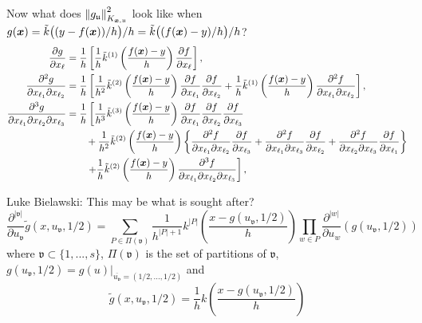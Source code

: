 \documentclass[letterpaper]{amsart}
\newcommand{\KXu}{K_{\vx,\fu}}
\newcommand{\tk}{\tilde{k}}
\begin{document}
Now what does $\norm[\KXu]{g_\fu}^2$ look like when $g(\vx) = \tk\bigl((y-f(\vx))/h\bigr)/h = \tk\bigl((f(\vx) - y)/h\bigr)/h$?
\begin{align*}
	\frac{\partial g}{\partial x_\ell} &= \frac 1{h} \left[ \frac 1h \tk^{(1)}\left(\frac{f(\vx) - y}{h} \right) \frac{\partial f}{\partial x_\ell} \right], \\
	\frac{\partial^2 g}{\partial x_{\ell_1} \partial x_{\ell_2}}
	&= \frac 1{h} \left[\frac 1{h^2} \tk^{(2)}\left(\frac{f(\vx) - y}{h} \right)  \frac{\partial f}{\partial x_{\ell_1}}  \frac{\partial f}{\partial x_{\ell_2}} + \frac 1h \tk^{(1)}\left(\frac{f(\vx) - y}{h} \right)  \frac{\partial^2 f}{\partial x_{\ell_1}\partial x_{\ell_2}} \right], \\
	\frac{\partial^3 g}{\partial x_{\ell_1} \partial x_{\ell_2} \partial x_{\ell_3}}
 &= \frac 1{h} \left[\frac 1{h^3} \tk^{(3)}\left(\frac{f(\vx) - y}{h} \right)  \frac{\partial f}{\partial x_{\ell_1}}  
 \frac{\partial f}{\partial x_{\ell_2}} \frac{\partial f}{\partial x_{\ell_3}} \right.\\
 & \qquad + \frac 1{h^2} \tk^{(2)}\left(\frac{f(\vx) - y}{h} \right)
 \left \{ \frac{\partial^2 f}{\partial x_{\ell_1}\partial x_{\ell_2}} \frac{\partial f}{\partial x_{\ell_3}}
 + \frac{\partial^2 f}{\partial x_{\ell_1}\partial x_{\ell_3}} \frac{\partial f}{\partial x_{\ell_2}}
 + \frac{\partial^2 f}{\partial x_{\ell_2}\partial x_{\ell_3}} \frac{\partial f}{\partial x_{\ell_1}}
 \right\} \\
 & \qquad \left . + \frac 1{h} \tk^{(2)}\left(\frac{f(\vx) - y}{h} \right)
 \frac{\partial^3 f}{\partial x_{\ell_1} \partial x_{\ell_2} \partial x_{\ell_3}}
 \right ],
\end{align*}

Luke Bielawski: This may be what is sought after?
\[
\frac{\partial^{|\mathfrak{v}|}}{\partial u_\mathfrak{v}} \tilde{g}(x, u_\mathfrak{v}, 1/2) =  \sum_{P \in \Pi(\mathfrak{v})} \frac{1}{h^{|P|+1}} k^{|P|}\left(\frac{x - g(u_\mathfrak{v}, 1/2)}{h}\right) \prod_{w \in P} \frac{\partial^{|w|}}{\partial u_w}(g(u_\mathfrak{v}, 1/2))
\]
where $\mathfrak{v}\subset \{1, ..., s\}$, $\Pi(\mathfrak{v})$ is the set of partitions of $\mathfrak{v}$, $g(u_\mathfrak{v}, 1/2) = g(u)|_{\overline{u_\mathfrak{v}} = (1/2, ..., 1/2)}$ and
\[
\tilde{g}(x, u_\mathfrak{v}, 1/2) = \frac{1}{h}k\left( \frac{x - g(u_\mathfrak{v}, 1/2)}{h}\right)
\]
\end{document}
